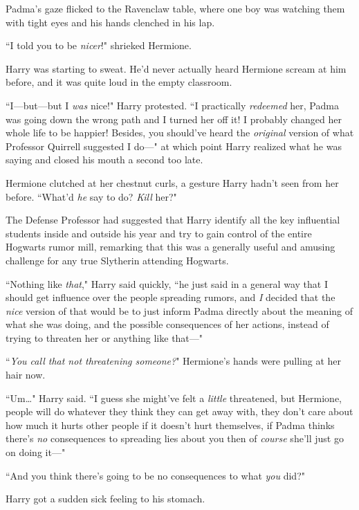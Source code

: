 Padma's gaze flicked to the Ravenclaw table, where one boy was watching them with tight eyes and his hands clenched in his lap.


``I told you to be \emph{nicer}!" shrieked Hermione.

Harry was starting to sweat. He'd never actually heard Hermione scream at him before, and it was quite loud in the empty classroom.

``I---but---but I \emph{was} nice!" Harry protested. ``I practically \emph{redeemed} her, Padma was going down the wrong path and I turned her off it! I probably changed her whole life to be happier! Besides, you should've heard the \emph{original} version of what Professor Quirrell suggested I do---" at which point Harry realized what he was saying and closed his mouth a second too late.

Hermione clutched at her chestnut curls, a gesture Harry hadn't seen from her before. ``What'd \emph{he} say to do? \emph{Kill} her?"

The Defense Professor had suggested that Harry identify all the key influential students inside and outside his year and try to gain control of the entire Hogwarts rumor mill, remarking that this was a generally useful and amusing challenge for any true Slytherin attending Hogwarts.

``Nothing like \emph{that}," Harry said quickly, ``he just said in a general way that I should get influence over the people spreading rumors, and \emph{I} decided that the \emph{nice} version of that would be to just inform Padma directly about the meaning of what she was doing, and the possible consequences of her actions, instead of trying to threaten her or anything like that---"

``\emph{You call that not threatening someone?}" Hermione's hands were pulling at her hair now.

``Um{\ldots}" Harry said. ``I guess she might've felt a \emph{little} threatened, but Hermione, people will do whatever they think they can get away with, they don't care about how much it hurts other people if it doesn't hurt themselves, if Padma thinks there's \emph{no} consequences to spreading lies about you then of \emph{course} she'll just go on doing it---"

``And you think there's going to be no consequences to what \emph{you} did?"

Harry got a sudden sick feeling to his stomach.


